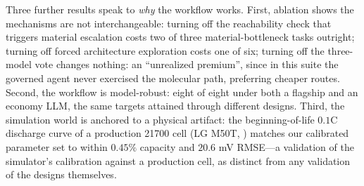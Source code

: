 Three further results speak to \emph{why} the workflow works. First, ablation
shows the mechanisms are not interchangeable: turning off the reachability
check that triggers material escalation costs two of three
material-bottleneck tasks outright; turning off forced architecture exploration
costs one of six; turning off the three-model vote changes nothing: an
``unrealized premium'', since in this suite the governed agent never exercised
the molecular path, preferring cheaper routes. Second, the workflow is
model-robust: eight of eight under both a flagship and an economy LLM, the same
targets attained through different designs. Third, the simulation world is
anchored to a physical artifact: the beginning-of-life $0.1$C discharge curve
of a production 21700 cell (LG M50T, \cite{lgm50dataset2024,
kirkaldy2024lgm50}) matches our calibrated parameter set
\cite{oregan2022electrochim} to within $0.45\%$ capacity and $20.6$ mV RMSE---a
validation of the simulator's calibration against a production cell, as
distinct from any validation of the designs themselves.

